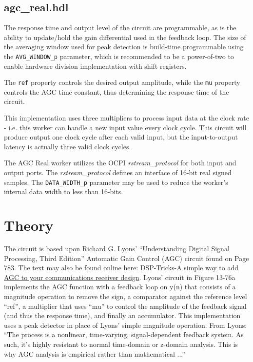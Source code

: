 \documentclass{article}
\def\comp{agc\_real}
\begin{document}
\subsection*{\comp.hdl}
\begin{flushleft}
	The response time and output level of the circuit are programmable, as is the ability to update/hold the gain differential used in the feedback loop. The size of the averaging window used for peak detection is build-time programmable using the \verb+AVG_WINDOW_p+ parameter, which is recommended to be a power-of-two to enable hardware division implementation with shift registers.\medskip

	The \verb+ref+ property controls the desired output amplitude, while the \verb+mu+ property controls the AGC time constant, thus determining the response time of the circuit.\medskip

	This implementation uses three multipliers to process input data at the clock rate - i.e. this worker can handle a new input value every clock cycle. This circuit will produce output one clock cycle after each valid input, but the input-to-output latency is actually three valid clock cycles.\medskip

	The AGC Real worker utilizes the OCPI \textit{rstream\_protocol} for both input and output ports. The \textit{rstream\_protocol} defines an interface of 16-bit real signed samples. The \verb+DATA_WIDTH_p+ parameter may be used to reduce the worker's internal data width to less than 16-bits.
\end{flushleft}

\section*{Theory}
\begin{flushleft}
	The circuit is based upon Richard G. Lyons' ``Understanding Digital Signal Processing, Third Edition'' Automatic Gain Control (AGC) circuit found on Page 783. The text may also be found online here: \href{http://www.embedded.com/design/other/4214571/A-simple-way-to-add-AGC-to-your-communications-receiver-design-}{DSP-Tricks-A simple way to add AGC to your communications receiver design}. Lyons' circuit in Figure 13-76a implements the AGC function with a feedback loop on y(n) that consists of a magnitude operation to remove the sign, a comparator against the reference level ``ref'', a multiplier that uses ``mu'' to control the amplitude of the feedback signal (and thus the response time), and finally an accumulator. This implementation uses a peak detector in place of Lyons' simple magnitude operation. From Lyons: ``The process is a nonlinear, time-varying, signal-dependent feedback system. As such, it's highly resistant to normal time-domain or z-domain analysis. This is why AGC analysis is empirical rather than mathematical ...''
\end{flushleft}
\end{document}
